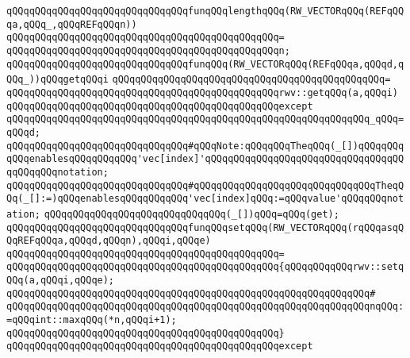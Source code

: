 \newline
\verb|qQQqqQQqqQQqqQQqqQQqqQQqqQQqqQQqfunqQQqlengthqQQq(RW_VECTORqQQq(REFqQQqa,qQQq_,qQQqREFqQQqn))|\newline
\verb|qQQqqQQqqQQqqQQqqQQqqQQqqQQqqQQqqQQqqQQqqQQqqQQq=|\newline
\verb|qQQqqQQqqQQqqQQqqQQqqQQqqQQqqQQqqQQqqQQqqQQqqQQqn;|\newline
\newline
\verb|qQQqqQQqqQQqqQQqqQQqqQQqqQQqqQQqfunqQQq(RW_VECTORqQQq(REFqQQqa,qQQqd,qQQq_))qQQqgetqQQqi|\newline
\verb|qQQqqQQqqQQqqQQqqQQqqQQqqQQqqQQqqQQqqQQqqQQqqQQq=|\newline
\verb|qQQqqQQqqQQqqQQqqQQqqQQqqQQqqQQqqQQqqQQqqQQqqQQqrwv::getqQQq(a,qQQqi)|\newline
\verb|qQQqqQQqqQQqqQQqqQQqqQQqqQQqqQQqqQQqqQQqqQQqqQQqexcept|\newline
\verb|qQQqqQQqqQQqqQQqqQQqqQQqqQQqqQQqqQQqqQQqqQQqqQQqqQQqqQQqqQQqqQQq_qQQq=qQQqd;|\newline
\newline
\verb|qQQqqQQqqQQqqQQqqQQqqQQqqQQqqQQq#qQQqNote:qQQqqQQqTheqQQq(_[])qQQqqQQqqQQqenablesqQQqqQQqqQQq'vec[index]'qQQqqQQqqQQqqQQqqQQqqQQqqQQqqQQqqQQqqQQqqQQqnotation;|\newline
\verb|qQQqqQQqqQQqqQQqqQQqqQQqqQQqqQQq#qQQqqQQqqQQqqQQqqQQqqQQqqQQqqQQqTheqQQq(_[]:=)qQQqenablesqQQqqQQqqQQq'vec[index]qQQq:=qQQqvalue'qQQqqQQqnotation;|\newline
\newline
\verb|qQQqqQQqqQQqqQQqqQQqqQQqqQQqqQQq(_[])qQQq=qQQq(get);|\newline
\newline
\verb|qQQqqQQqqQQqqQQqqQQqqQQqqQQqqQQqfunqQQqsetqQQq(RW_VECTORqQQq(rqQQqasqQQqREFqQQqa,qQQqd,qQQqn),qQQqi,qQQqe)|\newline
\verb|qQQqqQQqqQQqqQQqqQQqqQQqqQQqqQQqqQQqqQQqqQQqqQQq=|\newline
\verb|qQQqqQQqqQQqqQQqqQQqqQQqqQQqqQQqqQQqqQQqqQQqqQQq{qQQqqQQqqQQqrwv::setqQQq(a,qQQqi,qQQqe);|\newline
\verb|qQQqqQQqqQQqqQQqqQQqqQQqqQQqqQQqqQQqqQQqqQQqqQQqqQQqqQQqqQQqqQQq#|\newline
\verb|qQQqqQQqqQQqqQQqqQQqqQQqqQQqqQQqqQQqqQQqqQQqqQQqqQQqqQQqqQQqqQQqnqQQq:=qQQqint::maxqQQq(*n,qQQqi+1);|\newline
\verb|qQQqqQQqqQQqqQQqqQQqqQQqqQQqqQQqqQQqqQQqqQQqqQQq}|\newline
\verb|qQQqqQQqqQQqqQQqqQQqqQQqqQQqqQQqqQQqqQQqqQQqqQQqexcept|\newline
